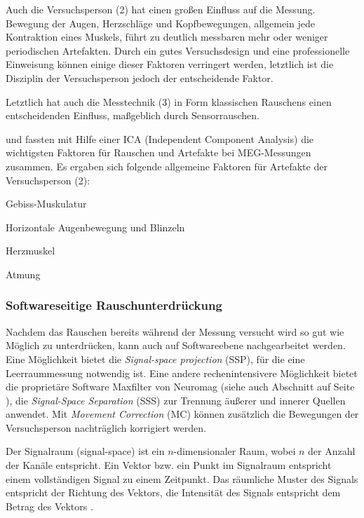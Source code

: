 \documentclass[doc,a4paper,12pt]{apa6}
\makeatletter
\DeclareRobustCommand*{\nameref}[1]{%
      \glqq{\myorg@nameref{#1}}\grqq%
    }%
\makeatother
\begin{document}
Auch die Versuchsperson (2) hat einen großen Einfluss auf die Messung. Bewegung der Augen, Herzschläge und Kopfbewegungen, allgemein jede Kontraktion eines Muskels, führt zu deutlich messbaren mehr oder weniger periodischen Artefakten. Durch ein gutes Versuchsdesign und eine professionelle Einweisung können einige dieser Faktoren verringert werden, letztlich ist die Disziplin der Versuchsperson jedoch der entscheidende Faktor.

Letztlich hat auch die Messtechnik (3) in Form klassischen Rauschens einen entscheidenden Einfluss, maßgeblich durch Sensorrauschen.

\textcite{vigario1998independent} und \textcite{vigario2000independent} fassten mit Hilfe einer ICA (Independent Component Analysis) die wichtigsten Faktoren für Rauschen und Artefakte bei MEG-Messungen zusammen. Es ergaben sich folgende allgemeine Faktoren für Artefakte der Versuchsperson (2):

\begin{compactitem}
\item Gebiss-Muskulatur
\item Horizontale Augenbewegung und Blinzeln
\item Herzmuskel
\item Atmung
\end{compactitem}

\subsubsection{Softwareseitige Rauschunterdrückung}
\label{sec:maxfilter}

Nachdem das Rauschen bereits während der Messung versucht wird so gut wie Möglich zu unterdrücken, kann auch auf Softwareebene nachgearbeitet werden. Eine Möglichkeit bietet die \emph{Signal-space projection} (SSP), für die eine Leerraummessung notwendig ist. Eine andere rechenintensivere Möglichkeit bietet die proprietäre Software Maxfilter von Neuromag (siehe auch Abschnitt \nameref{sec:software} auf Seite \pageref{sec:software}), die \emph{Signal-Space Separation} (SSS) zur Trennung äußerer und innerer Quellen anwendet. Mit \emph{Movement Correction} (MC) können zusätzlich die Bewegungen der Versuchsperson nachträglich korrigiert werden.

Der Signalraum (signal-space) ist ein $n$-dimensionaler Raum, wobei $n$ der Anzahl der Kanäle entspricht. Ein Vektor bzw. ein Punkt im Signalraum entspricht einem vollständigen Signal zu einem Zeitpunkt. Das räumliche Muster des Signals entspricht der Richtung des Vektors, die Intensität des Signals entspricht dem Betrag des Vektors \parencite{hansen2010meg}.
\end{document}
